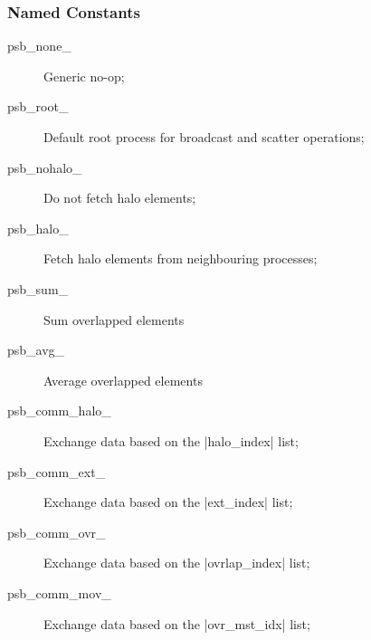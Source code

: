 \subsubsection{Named Constants}
\label{sec:cd_constants}
\begin{description}
\item[psb\_none\_] Generic no-op;
\item[psb\_root\_] Default root process for broadcast and scatter operations;
\item[psb\_nohalo\_]  Do not fetch halo elements;
\item[psb\_halo\_]  Fetch halo elements from neighbouring processes;
\item[psb\_sum\_] Sum overlapped elements
\item[psb\_avg\_] Average overlapped elements
\item[psb\_comm\_halo\_] Exchange data based on the \fortinline|halo_index|
  list;
\item[psb\_comm\_ext\_] Exchange data based on the \fortinline|ext_index|
  list;
\item[psb\_comm\_ovr\_] Exchange data based on the \fortinline|ovrlap_index|
  list;
\item[psb\_comm\_mov\_] Exchange data based on the \fortinline|ovr_mst_idx|
  list;

\end{description}


